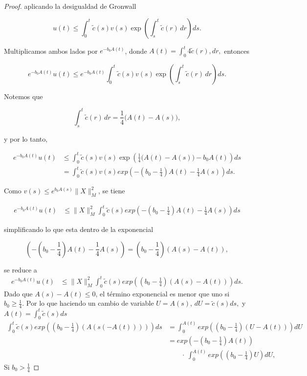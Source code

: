 \documentclass[
  spanish,
  us-letterpaper,
]{scrreprt}
\theoremstyle{plain}
\theoremstyle{plain}
\theoremstyle{definition}
\theoremstyle{remark}
\begin{document}
\begin{proof}
aplicando la desigualdad de Gronwall

\[u(t) \leq \int_0^t \widetilde{c}(s) v(s) \exp\!\left( \int_s^t \widetilde{c}(r) \, dr \right) ds.\]

Multiplicamos ambos lados por \(e^{-b_0 A(t)}\), donde
\(A(t) = \int_0^t 4\widetilde{c}(r),dr,\) entonces

\[e^{-b_0 A(t)}u(t) \leq e^{-b_0 A(t)}\int_0^t \widetilde{c}(s) v(s) \exp\!\left( \int_s^t \widetilde{c}(r) \, dr \right) ds.\]

Notemos que

\[\int_s^t \widetilde{c}(r) \, dr = \frac{1}{4} \bigl( A(t) - A(s) \bigr),\]

y por lo tanto,

\begin{align*}e^{-b_0 A(t)} u(t)&\leq \int_0^t \widetilde{c}(s)v(s)\exp\!\left( \frac{1}{4}\bigl( A(t) - A(s) \bigr) -b_0 A(t)\right) ds \\  & = \int_0^t \widetilde{c}(s)v(s)exp\left(-\left(b_0-\frac{1}{4}\right)A(t) - \frac{1}{4}A(s)\right)ds.\end{align*}

Como \(v(s) \leq e^{b_0A(s)}\|{X}\|_M^2\), se tiene

\begin{align*}e^{-b_0 A(t)} u(t)&\leq \|{X}\|_M^2  \int_0^t \widetilde{c}(s)exp\left(-\left(b_0-\frac{1}{4}\right)A(t) - \frac{1}{4}A(s)\right)ds\end{align*}

simplificando lo que esta dentro de la exponencial

\[\left(-\left(b_0-\frac{1}{4}\right)A(t) - \frac{1}{4}A(s)\right) = \left(b_0-\frac{1}{4}\right)(A(s) -A(t)),\]

se reduce a \begin{align*}
e^{-b_0 A(t)} u(t)
&\leq \|{X}\|_M^2  \int_0^t \widetilde{c}(s)exp \left(\left(b_0-\frac{1}{4}\right)(A(s) -A(t))\right) ds.
\end{align*} Dado que \(A(s)-A(t)\leq 0\), el término exponencial es
menor que uno si \(b_0\geq\frac{1}{4}.\) Por lo que haciendo un cambio
de variable \(U = A(s)\), \(dU=\widetilde{c}(s)ds,\) y
\(A(t)= \int_0^t \widetilde{c}(s)ds\) \begin{align*}
\int_0^t \widetilde{c}(s) exp\left(\left(b_0 - \frac{1}{4}\right)(A(s(-A(t))))\right)ds & = \int_0^{A(t)}exp\left(\left( b_0 - \frac{1}{4}\right)(U-A(t))\right)dU\\
& = exp\left(-\left( b_0 - \frac{1}{4}\right)A(t)\right) \\
&  \ \ \ \ \ \ \ \ \ \cdot \ \int_0^{A(t)}exp\left(\left( b_0 - \frac{1}{4}\right)U\right)dU,
\end{align*} Si \(b_0>\frac{1}4{}\)


\end{proof}
\end{document}
